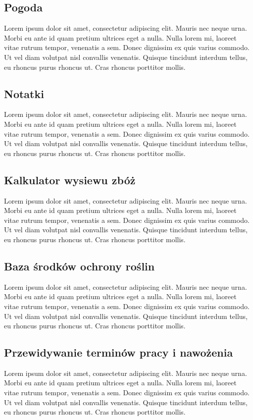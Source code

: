 \documentclass[a4paper,12pt,oneside]{book}
\begin{document}
	\subsection{Pogoda}
		Lorem ipsum dolor sit amet, consectetur adipiscing elit. Mauris nec neque urna. Morbi eu ante id quam pretium ultrices eget a nulla. Nulla lorem mi, laoreet vitae rutrum tempor, venenatis a sem. Donec dignissim ex quis varius commodo. Ut vel diam volutpat nisl convallis venenatis. Quisque tincidunt interdum tellus, eu rhoncus purus rhoncus ut. Cras rhoncus porttitor mollis.
	
	\subsection{Notatki}
		Lorem ipsum dolor sit amet, consectetur adipiscing elit. Mauris nec neque urna. Morbi eu ante id quam pretium ultrices eget a nulla. Nulla lorem mi, laoreet vitae rutrum tempor, venenatis a sem. Donec dignissim ex quis varius commodo. Ut vel diam volutpat nisl convallis venenatis. Quisque tincidunt interdum tellus, eu rhoncus purus rhoncus ut. Cras rhoncus porttitor mollis.
	
	\subsection{Kalkulator wysiewu zbóż}
		Lorem ipsum dolor sit amet, consectetur adipiscing elit. Mauris nec neque urna. Morbi eu ante id quam pretium ultrices eget a nulla. Nulla lorem mi, laoreet vitae rutrum tempor, venenatis a sem. Donec dignissim ex quis varius commodo. Ut vel diam volutpat nisl convallis venenatis. Quisque tincidunt interdum tellus, eu rhoncus purus rhoncus ut. Cras rhoncus porttitor mollis.
	
	\subsection{Baza środków ochrony roślin}
		Lorem ipsum dolor sit amet, consectetur adipiscing elit. Mauris nec neque urna. Morbi eu ante id quam pretium ultrices eget a nulla. Nulla lorem mi, laoreet vitae rutrum tempor, venenatis a sem. Donec dignissim ex quis varius commodo. Ut vel diam volutpat nisl convallis venenatis. Quisque tincidunt interdum tellus, eu rhoncus purus rhoncus ut. Cras rhoncus porttitor mollis.
	
	\subsection{Przewidywanie terminów pracy i nawożenia}
		Lorem ipsum dolor sit amet, consectetur adipiscing elit. Mauris nec neque urna. Morbi eu ante id quam pretium ultrices eget a nulla. Nulla lorem mi, laoreet vitae rutrum tempor, venenatis a sem. Donec dignissim ex quis varius commodo. Ut vel diam volutpat nisl convallis venenatis. Quisque tincidunt interdum tellus, eu rhoncus purus rhoncus ut. Cras rhoncus porttitor mollis.
		
\end{document}

